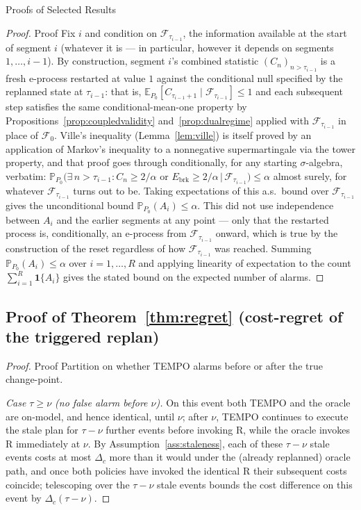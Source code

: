 \documentclass[trsc,dblanonrev]{informs4}
\newcommand{\E}{\mathbb{E}}
\newcommand{\Prob}{\mathbb{P}}
\newcommand{\F}{\mathcal{F}}
\newcommand{\Rmax}{\mathrm{R}}
\begin{document}
\begin{APPENDIX}{Proofs of Selected Results}
\begin{proof}{Proof}
Fix $i$ and condition on $\F_{\tau_{i-1}}$, the information available
at the start of segment $i$ (whatever it is --- in particular, however
it depends on segments $1,\dots,i-1$). By construction, segment $i$'s
combined statistic $(C_n)_{n > \tau_{i-1}}$ is a fresh e-process
restarted at value $1$ against the conditional null specified by the
replanned state at $\tau_{i-1}$: that is, $\E_{P_0}[C_{\tau_{i-1}+1}
\mid \F_{\tau_{i-1}}] \le 1$ and each subsequent step satisfies the
same conditional-mean-one property by
Propositions~\ref{prop:coupledvalidity} and~\ref{prop:dualregime}
applied with $\F_{\tau_{i-1}}$ in place of $\F_0$. Ville's inequality
(Lemma~\ref{lem:ville}) is itself proved by an application of Markov's
inequality to a nonnegative supermartingale via the tower property, and
that proof goes through conditionally, for any starting
$\sigma$-algebra, verbatim: $\Prob_{P_0}\bigl(\exists\, n > \tau_{i-1} :
C_n \ge 2/\alpha \text{ or } E_{\mathrm{brk}} \ge 2/\alpha \,\big|\,
\F_{\tau_{i-1}}\bigr) \le \alpha$ almost surely, for whatever
$\F_{\tau_{i-1}}$ turns out to be. Taking expectations of this a.s.\
bound over $\F_{\tau_{i-1}}$ gives the unconditional bound
$\Prob_{P_0}(A_i) \le \alpha$. This did not use independence between
$A_i$ and the earlier segments at any point --- only that the
restarted process is, conditionally, an e-process from $\F_{\tau_{i-1}}$
onward, which is true by the construction of the reset regardless of
how $\F_{\tau_{i-1}}$ was reached. Summing
$\Prob_{P_0}(A_i) \le \alpha$ over $i = 1, \dots, R$ and applying
linearity of expectation to the count $\sum_{i=1}^R \mathbf{1}\{A_i\}$
gives the stated bound on the expected number of alarms. \Halmos
\end{proof}

\subsection{Proof of Theorem~\ref{thm:regret} (cost-regret of the triggered replan)}

\begin{proof}{Proof}
Partition on whether TEMPO alarms before or after the true change-point.

\emph{Case $\tau \ge \nu$ (no false alarm before $\nu$).} On this event
both TEMPO and the oracle are on-model, and hence identical, until
$\nu$; after $\nu$, TEMPO continues to execute the stale plan for
$\tau - \nu$ further events before invoking $\Rmax$, while the oracle
invokes $\Rmax$ immediately at $\nu$. By Assumption~\ref{ass:staleness},
each of these $\tau - \nu$ stale events costs at most $\Delta_c$ more
than it would under the (already replanned) oracle path, and once both
policies have invoked the identical $\Rmax$ their subsequent costs
coincide; telescoping over the $\tau - \nu$ stale events bounds the
cost difference on this event by $\Delta_c (\tau - \nu)$.


\end{proof}
\end{APPENDIX}
\end{document}
